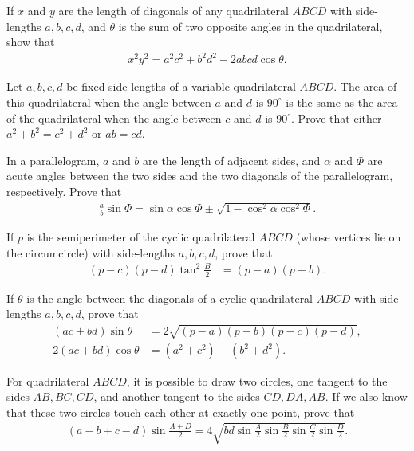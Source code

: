 \begin{question}
    If $x$ and $y$ are the length of diagonals of any quadrilateral $ABCD$ with side-lengths $a,b,c,d$, and $\theta$ is the sum of two opposite angles in the quadrilateral, show that
    \begin{align*}
        x^2y^2=a^2c^2+b^2d^2-2abcd\cos \theta.
    \end{align*}
\end{question}

\begin{question}
    Let $a,b,c,d$ be fixed side-lengths of a variable quadrilateral $ABCD$. The area of this quadrilateral when the angle between $a$ and $d$ is $90^\circ$ is the same as the area of the quadrilateral when the angle between $c$ and $d$ is $90^\circ$. Prove that either $a^2+b^2=c^2+d^2$ or $ab=cd$.
\end{question}


\begin{question}
    In a parallelogram, $a$ and $b$ are the length of adjacent sides, and $\alpha$ and $\Phi$ are acute angles between the two sides and the two diagonals of the parallelogram, respectively. Prove that
    \begin{align*}
        \frac{a}{b}\sin \Phi = \sin \alpha \cos \Phi \pm \sqrt{1-\cos^2\alpha \cos^2\Phi}.
    \end{align*}
\end{question}




\begin{question}
    If $p$ is the semiperimeter of the cyclic quadrilateral $ABCD$ (whose vertices lie on the circumcircle) with side-lengths $a,b,c,d$, prove that
    \begin{align*}
        (p-c)(p-d)\tan^2\frac{B}{2} &= (p-a)(p-b).
    \end{align*}
\end{question}

\begin{question}
    If $\theta$ is the angle between the diagonals of a cyclic quadrilateral $ABCD$ with side-lengths $a,b,c,d$, prove that
    \begin{align*}
        (ac+bd)\sin \theta &= 2\sqrt{(p-a)(p-b)(p-c)(p-d)},\\
        2(ac+bd)\cos \theta &= (a^2+c^2)-(b^2+d^2).
    \end{align*}
\end{question}

\begin{question}
    For quadrilateral $ABCD$, it is possible to draw two circles, one tangent to the sides $AB,BC,CD$, and another tangent to the sides $CD, DA, AB$. If we also know that these two circles touch each other at exactly one point, prove that
    \begin{align*}
        (a-b+c-d)\sin\frac{A+D}{2} = 4 \sqrt{bd\sin\frac{A}{2}\sin\frac{B}{2}\sin\frac{C}{2}\sin\frac{D}{2}}.
    \end{align*}
\end{question}

